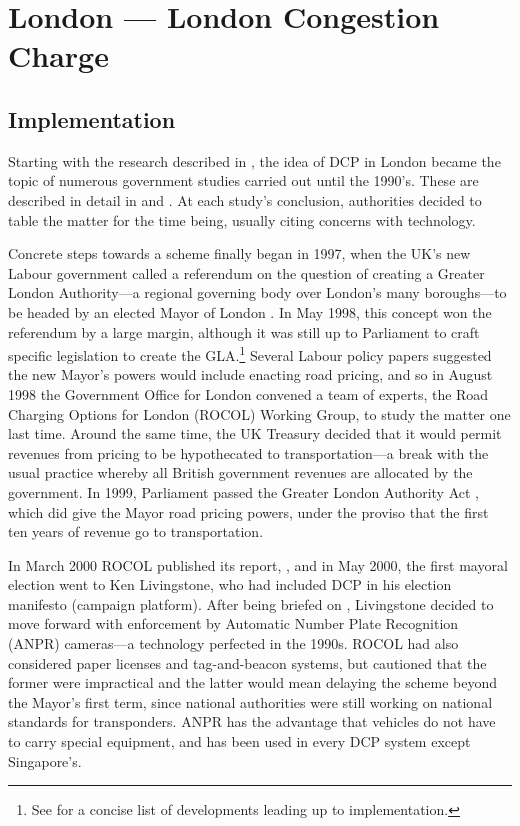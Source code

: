 \section{London --- London Congestion Charge}\label{sec:london}

\subsection{Implementation}

Starting with the research described in \citet{Thomson1967a}, the idea of DCP in London became the topic of numerous government studies carried out until the 1990's. These are described in detail in \citet[Ch. 4]{Richards2006} and \citet[Ch. 4]{Gomez-Ibanez1994}. At each study's conclusion, authorities decided to table the matter for the time being, usually citing concerns with technology.

Concrete steps towards a scheme finally began in 1997, when the UK's new Labour government called a referendum on the question of creating a Greater London Authority---a regional governing body over London's many boroughs---to be headed by an elected Mayor of London \citep[Ch. 6]{Richards2006}. In May 1998, this concept won the referendum by a large margin, although it was still up to Parliament to craft specific legislation to create the GLA.\footnote{See \citet[Sec. 7.2]{TfLFifth2007} for a concise list of developments leading up to implementation.} Several Labour policy papers suggested the new Mayor's powers would include enacting road pricing, and so in August 1998 the Government Office for London convened a team of experts, the Road Charging Options for London (ROCOL) Working Group, to study the matter one last time. Around the same time, the UK Treasury decided that it would permit revenues from pricing to be hypothecated to transportation---a break with the usual practice whereby all British government revenues are allocated by the government.  In 1999, Parliament passed the Greater London Authority Act \citep{Parliament1999}, which did give the Mayor road pricing powers, under the proviso that the first ten years of revenue go to transportation. 

In March 2000 ROCOL published its report, \citet{ROCOL2000}, and in May 2000, the first mayoral election went to Ken Livingstone, who had included DCP in his election manifesto (campaign platform). After being briefed on \citet{ROCOL2000}, Livingstone decided to move forward with enforcement by Automatic Number Plate Recognition (ANPR) cameras---a technology perfected in the 1990s. ROCOL had also considered paper licenses and tag-and-beacon systems, but cautioned that the former were impractical and the latter would mean delaying the scheme beyond the Mayor's first term, since national authorities were still working on national standards for transponders. ANPR has the advantage that vehicles do not have to carry special equipment, and has been used in every DCP system except Singapore's.

